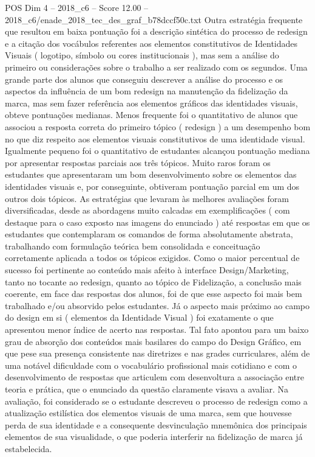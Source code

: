\begin{textsample}{POS Dim 4 – 2018\_c6 – Score 12.00 – 2018\_c6/enade\_2018\_tec\_des\_graf\_b78dccf50c.txt}
Outra estratégia frequente que resultou em baixa pontuação foi a descrição sintética do processo de redesign e a citação dos vocábulos referentes aos elementos constitutivos de Identidades Visuais ( logotipo, símbolo ou cores institucionais ), mas sem a análise do primeiro ou considerações sobre o trabalho a ser realizado com os segundos.
Uma grande parte dos alunos que conseguiu descrever a análise do processo e os aspectos da influência de um bom redesign na manutenção da fidelização da marca, mas sem fazer referência aos elementos gráficos das identidades visuais, obteve pontuações medianas.
Menos frequente foi o quantitativo de alunos que associou a resposta correta do primeiro tópico ( redesign ) a um desempenho bom no que diz respeito aos elementos visuais constitutivos de uma identidade visual.
Igualmente pequeno foi o quantitativo de estudantes alcançou pontuação mediana por apresentar respostas parciais aos três tópicos.
Muito raros foram os estudantes que apresentaram um bom desenvolvimento sobre os elementos das identidades visuais e, por conseguinte, obtiveram pontuação parcial em um dos outros dois tópicos.
As estratégias que levaram às melhores avaliações foram diversificadas, desde as abordagens muito calcadas em exemplificações ( com destaque para o caso exposto nas imagens do enunciado ) até respostas em que os estudantes que contemplaram os comandos de forma absolutamente abstrata, trabalhando com formulação teórica bem consolidada e conceituação corretamente aplicada a todos os tópicos exigidos.
Como o maior percentual de sucesso foi pertinente ao conteúdo mais afeito à interface Design/Marketing, tanto no tocante ao redesign, quanto ao tópico de Fidelização, a conclusão mais coerente, em face das respostas dos alunos, foi de que esse aspecto foi mais bem trabalhado e/ou absorvido pelos estudantes.
Já o aspecto mais próximo ao campo do design em si ( elementos da Identidade Visual ) foi exatamente o que apresentou menor índice de acerto nas respostas.
Tal fato apontou para um baixo grau de absorção dos conteúdos mais basilares do campo do Design Gráfico, em que pese sua presença consistente nas diretrizes e nas grades curriculares, além de uma notável dificuldade com o vocabulário profissional mais cotidiano e com o desenvolvimento de respostas que articulem com desenvoltura a associação entre teoria e prática, que o enunciado da questão claramente visava a avaliar.
Na avaliação, foi considerado se o estudante descreveu o processo de redesign como a atualização estilística dos elementos visuais de uma marca, sem que houvesse perda de sua identidade e a consequente desvinculação mnemônica dos principais elementos de sua visualidade, o que poderia interferir na fidelização de marca já estabelecida.

\end{textsample}
